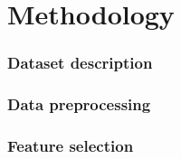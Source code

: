 \section{Methodology}


\begin{frame}
    \frametitle{Dataset description}
    \vspace{3mm}



    \vfill 
\end{frame}


\begin{frame}
    \frametitle{Data preprocessing}
    \vspace{3mm}



    \vfill 
\end{frame}


\begin{frame}
    \frametitle{Feature selection}
    \vspace{3mm}



    \vfill 
\end{frame}